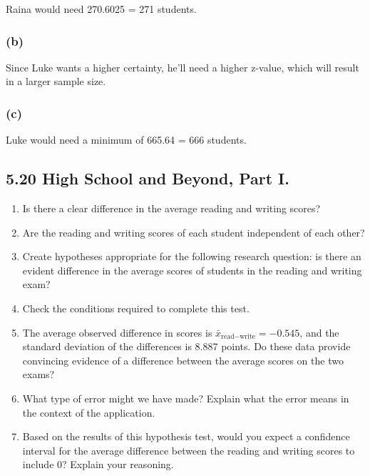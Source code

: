 \documentclass[]{article}
\newenvironment{Shaded}{\begin{snugshade}}{\end{snugshade}}
\newcommand{\DecValTok}[1]{\textcolor[rgb]{0.00,0.00,0.81}{#1}}
\newcommand{\FloatTok}[1]{\textcolor[rgb]{0.00,0.00,0.81}{#1}}
\newcommand{\StringTok}[1]{\textcolor[rgb]{0.31,0.60,0.02}{#1}}
\newcommand{\CommentTok}[1]{\textcolor[rgb]{0.56,0.35,0.01}{\textit{#1}}}
\newcommand{\OperatorTok}[1]{\textcolor[rgb]{0.81,0.36,0.00}{\textbf{#1}}}
\newcommand{\NormalTok}[1]{#1}
\providecommand{\tightlist}{%
  \setlength{\itemsep}{0pt}\setlength{\parskip}{0pt}}
\begin{document}
Raina would need 270.6025 = 271 students.

\subsubsection{(b)}\label{b}

Since Luke wants a higher certainty, he'll need a higher z-value, which
will result in a larger sample size.

\subsubsection{(c)}\label{c}

\begin{Shaded}
\end{Shaded}

Luke would need a minimum of 665.64 = 666 students.

\subsection{5.20 High School and Beyond, Part
I.}\label{high-school-and-beyond-part-i.}

\begin{enumerate}
\def\labelenumi{(\alph{enumi})}
\tightlist
\item
  Is there a clear difference in the average reading and writing scores?
\item
  Are the reading and writing scores of each student independent of each
  other?
\item
  Create hypotheses appropriate for the following research question: is
  there an evident difference in the average scores of students in the
  reading and writing exam?
\item
  Check the conditions required to complete this test.
\item
  The average observed difference in scores is
  \(\bar{x}_{\text{read}-\text{write}} = -0.545\), and the standard
  deviation of the differences is 8.887 points. Do these data provide
  convincing evidence of a difference between the average scores on the
  two exams?
\item
  What type of error might we have made? Explain what the error means in
  the context of the application.
\item
  Based on the results of this hypothesis test, would you expect a
  confidence interval for the average difference between the reading and
  writing scores to include 0? Explain your reasoning.
\end{enumerate}
\end{document}
